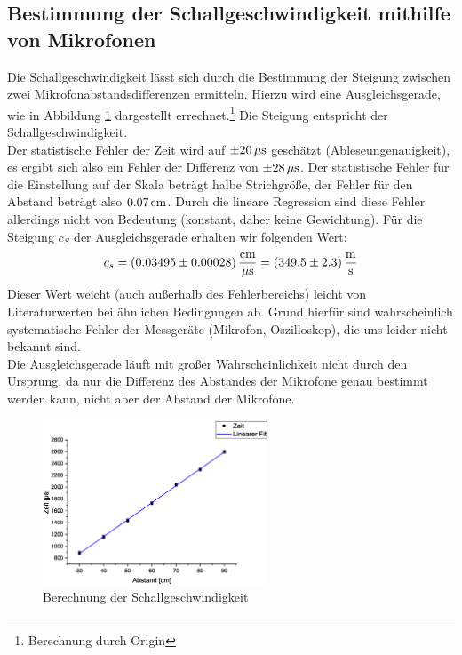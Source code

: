 \subsection{Bestimmung der Schallgeschwindigkeit mithilfe von Mikrofonen}
Die Schallgeschwindigkeit lässt sich durch die Bestimmung der Steigung zwischen zwei Mikrofonabstandsdifferenzen ermitteln. Hierzu wird eine Ausgleichsgerade, wie in Abbildung \ref{fig:aufgabe3} dargestellt errechnet.\footnote{Berechnung durch Origin} Die Steigung entspricht der Schallgeschwindigkeit.\\
Der statistische Fehler der Zeit wird auf $\pm \unit[20]{\mu s}$ geschätzt (Ableseungenauigkeit), es ergibt sich also ein Fehler der Differenz von $\pm \unit[28]{\mu s}$. Der statistische Fehler für die Einstellung auf der Skala beträgt halbe Strichgröße, der Fehler für den Abstand beträgt also $\unit[0.07]{cm}$. Durch die lineare Regression sind diese Fehler allerdings nicht von Bedeutung (konstant, daher keine Gewichtung). Für die Steigung $c_S$ der Ausgleichsgerade erhalten wir folgenden Wert:
\begin{equation}
c_s = \unit[(0.03495 \pm 0.00028)]{\frac{cm}{\mu s}} = \unit[(349.5 \pm 2.3)]{\frac{m}{s}}
\end{equation}
Dieser Wert weicht (auch außerhalb des Fehlerbereichs) leicht von Literaturwerten bei ähnlichen Bedingungen ab. Grund hierfür sind wahrscheinlich systematische Fehler der Messgeräte (Mikrofon, Oszilloskop), die uns leider nicht bekannt sind.\\
Die Ausgleichsgerade läuft mit großer Wahrscheinlichkeit nicht durch den Ursprung, da nur die Differenz des Abstandes der Mikrofone genau bestimmt werden kann, nicht aber der Abstand der Mikrofone.

\begin{figure}
\begin{center}
\includegraphics[width=0.6\textwidth]{Bilder/aufgabe3.eps}
\caption{Berechnung der Schallgeschwindigkeit}
\label{fig:aufgabe3}
\end{center}
\end{figure}